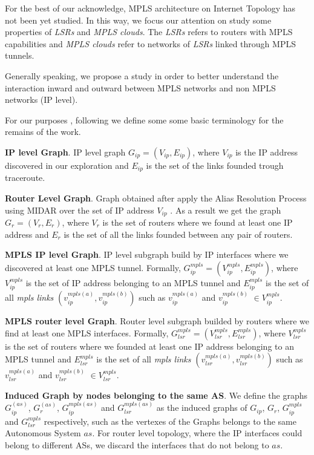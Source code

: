 For the best of our acknowledge, MPLS architecture on Internet Topology has not been yet studied. In this way, we focus our attention on study some properties of \textit{LSRs} and \textit{MPLS clouds}. The \textit{LSRs} refers to routers with MPLS capabilities and \textit{MPLS clouds} refer to networks of \textit{LSRs} linked through MPLS tunnels. 

Generally speaking, we propose a study  in order to better understand the interaction inward and outward between MPLS networks and non MPLS networks (IP level).

For our purposes , following  we define some some basic terminology for the remains of the work.  

\textbf{IP level Graph}. IP level graph $G_{ip}=(V_{ip}, E_{ip})$, where $V_{ip}$ is the IP address discovered in our exploration and $E_{ip}$ is the set of the links founded trough traceroute. 

\textbf{Router Level Graph}. Graph obtained after apply the Alias Resolution Process using MIDAR over the set of IP address $V_{ip}$ . As a result we get the graph $G_{r}=(V_{r}, E_{r})$, where $V_{r}$ is the set of routers where we found at least one IP address and $E_{r}$ is the set of all the links founded between any pair of routers.

\textbf{MPLS IP level Graph}. IP level subgraph build by IP interfaces where we discovered at least one MPLS tunnel. Formally, $G^{mpls}_{ip}=(V^{mpls}_{ip}, E^{mpls}_{ip})$, where  $V^{mpls}_{ip}$ is the set of IP address  belonging to an MPLS tunnel and  $ E^{mpls}_{ip}$ is the set of all \textit{mpls links} $(v^{mpls(a)}_{ip}, v^{mpls(b)}_{ip})$ such as $v^{mpls(a)}_{ip}$ and $v^{mpls(b)}_{ip}$ $\in V^{mpls}_{ip}$.


\textbf{MPLS router level Graph}. Router level subgraph builded by routers where we find at least one MPLS interfaces. Formally, $G^{mpls}_{lsr}=(V^{mpls}_{lsr}, E^{mpls}_{lsr})$, where  $V^{mpls}_{lsr}$ is the set of routers where we founded at least one IP address belonging to an MPLS tunnel and  $E^{mpls}_{lsr}$ is the set of all \textit{mpls links} $(v^{mpls(a)}_{lsr}, v^{mpls(b)}_{lsr})$ such as $v^{mpls(a)}_{lsr}$ and  $v^{mpls(b)}_{lsr}$  $\in V^{mpls}_{lsr}$.

\textbf{Induced Graph by nodes belonging to the same AS}. We define the graphs $G^{(as)}_{ip}$, $G^{(as)}_{r}$, $G^{mpls(as)}_{ip}$ and $G^{mpls(as)}_{lsr}$ as the induced graphs of  $G_{ip}$, $G_{r}$, $G^{mpls}_{ip}$ and $G^{mpls}_{lsr}$ respectively, such as the vertexes of the Graphs belongs to the same Autonomous System $as$. For router level topology, where the IP interfaces could belong to different ASs, we discard the interfaces that do not belong to $as$.


